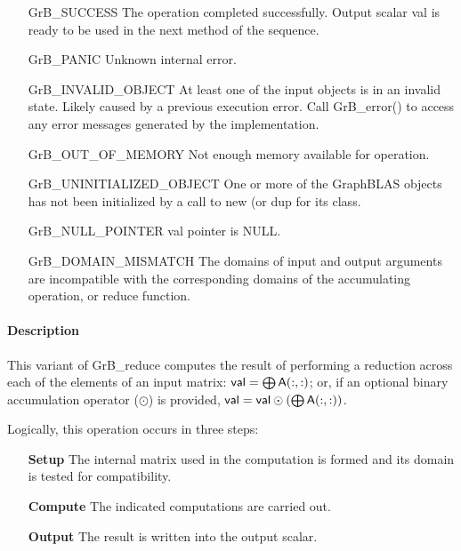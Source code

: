 \begin{itemize}[leftmargin=2.1in]
    \item[{\sf GrB\_SUCCESS}]         The operation completed
	    successfully. 
    Output scalar {\sf val} is ready to be used in the next method of 
    the sequence.

    \item[{\sf GrB\_PANIC}]            Unknown internal error.
    
    \item[{\sf GrB\_INVALID\_OBJECT}] At least one of the input objects is
	    in an invalid state. Likely caused by a previous execution error.
    Call {\sf GrB\_error()} to access 
    any error messages generated by the implementation.

    \item[{\sf GrB\_OUT\_OF\_MEMORY}]  Not enough memory available for operation.
    
    \item[{\sf GrB\_UNINITIALIZED\_OBJECT}] One or more of the GraphBLAS objects 
    has not been initialized by a call to {\sf new} (or {\sf dup} for its class.
    
    \item[{\sf GrB\_NULL\_POINTER}]  {\sf val} pointer is {\sf NULL}.
    
    \item[{\sf GrB\_DOMAIN\_MISMATCH}]    The domains of input and output arguments are
	incompatible with the corresponding domains of the accumulating operation, 
     or reduce function.
\end{itemize}

\paragraph{Description}

This variant of {\sf GrB\_reduce} computes the result of performing
a reduction across each of the elements of an input matrix:
${\sf val} = \bigoplus {\sf A}(:,:)$; 
or, if an optional binary accumulation 
operator ($\odot$) is provided, ${\sf val} = {\sf val} \odot (\bigoplus {\sf A}(:,:))$.  

Logically, this operation occurs in three steps:
\begin{enumerate}[leftmargin=0.75in]
\item[\bf Setup] The internal matrix used in the computation is formed 
and its domain is tested for compatibility.
\item[\bf Compute] The indicated computations are carried out.
\item[\bf Output] The result is written into the output scalar.
\end{enumerate}


